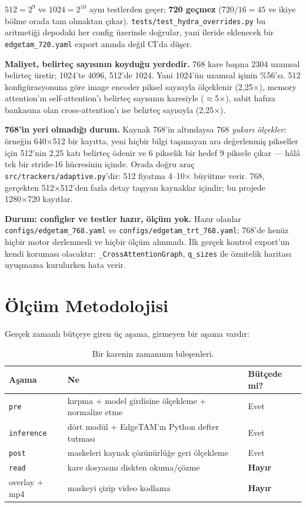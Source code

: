 $512 = 2^{9}$ ve $1024 = 2^{10}$ aynı testlerden geçer;
\textbf{720 geçmez} ($720/16 = 45$ ve ikiye bölme orada tam olmaktan
çıkar). \texttt{tests/test\_hydra\_overrides.py} bu aritmetiği depodaki
her config üzerinde doğrular, yani ileride eklenecek bir
\texttt{edgetam\_720.yaml} export anında değil CI'da düşer.

\textbf{Maliyet, belirteç sayısının koyduğu yerdedir.} 768 kare başına
2304 uzamsal belirteç üretir; 1024'te 4096, 512'de 1024. Yani 1024'ün
uzamsal işinin \%56'sı. 512 konfigürasyonuna göre image encoder piksel
sayısıyla ölçeklenir (2,25×), memory attention'ın self-attention'ı
belirteç sayısının karesiyle ($\approx$5×), sabit hafıza bankasına olan
cross-attention'ı ise belirteç sayısıyla (2,25×).

\textbf{768'in yeri olmadığı durum.} Kaynak 768'in altındaysa 768
\emph{yukarı ölçekler}: örneğin 640×512 bir kayıtta, yeni hiçbir bilgi
taşımayan ara değerlenmiş pikseller için 512'nin 2,25 katı belirteç
ödenir ve 6 pikselik bir hedef 9 piksele çıkar --- hâlâ tek bir
stride-16 hücresinin içinde. Orada doğru araç
\texttt{src/trackers/adaptive.py}'dir: 512 fiyatına 4--10× büyütme
verir. 768, gerçekten 512×512'den fazla detay taşıyan kaynaklar
içindir; bu projede 1280×720 kayıtlar.

\textbf{Durum: configler ve testler hazır, ölçüm yok.} Hazır olanlar
\texttt{configs/edgetam\_768.yaml} ve
\texttt{configs/edgetam\_trt\_768.yaml}; 768'de henüz hiçbir motor
derlenmedi ve hiçbir ölçüm alınmadı. İlk gerçek kontrol
export'un kendi koruması olacaktır: \texttt{\_CrossAttentionGraph},
\texttt{q\_sizes} ile öznitelik haritası uyuşmazsa kurulurken hata
verir.

\section{Ölçüm Metodolojisi}
\label{sec:olcum-yontemi}

Gerçek zamanlı bütçeye giren üç aşama, girmeyen bir aşama vardır:

\begin{table}[H]
  \centering
  \caption{Bir karenin zamanının bileşenleri.}
  \label{tab:kare-bilesenleri}
  \begin{tabular}{lll}
    \toprule
    Aşama & Ne & Bütçede mi? \\
    \midrule
    \texttt{pre} & kırpma + model girdisine ölçekleme + normalize etme & Evet \\
    \texttt{inference} & dört modül + EdgeTAM'ın Python defter tutması & Evet \\
    \texttt{post} & maskeleri kaynak çözünürlüğe geri ölçekleme & Evet \\
    \texttt{read} & kare dosyasını diskten okuma/çözme & \textbf{Hayır} \\
    overlay + mp4 & maskeyi çizip video kodlama & \textbf{Hayır} \\
    \bottomrule
  \end{tabular}
\end{table}
